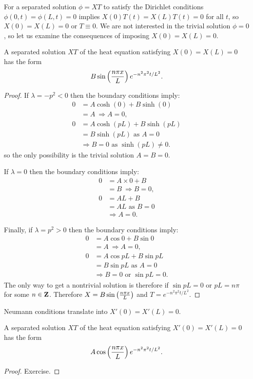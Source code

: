 For a separated solution $\phi=XT$ to satisfy the Dirichlet conditions $\phi(0,t)=\phi(L,t)=0$ implies $X(0)T(t)=X(L)T(t)=0$ for all $t$, so $X(0)=X(L)=0$ or $T\equiv 0$. We are not interested in the trivial solution $\phi=0$, so let us examine the consequences of imposing $X(0)=X(L)=0$.

\begin{lma}\label{lma:dirichlet}
A separated solution $XT$ of the heat equation satisfying $X(0)=X(L)=0$ has the form
\[B\sin\left(\frac{n \pi x}{L}\right)e^{-n^2\pi^2t/L^2}.\]
\end{lma}
\begin{proof}
If $\lambda=-p^2<0$ then the boundary conditions imply:
\begin{align*}
0&=A\cosh(0)+B\sinh(0)\\
 &=A\ \Rightarrow A=0,\\
0&=A\cosh(pL)+B\sinh(pL)\\
 &=B\sinh(pL)\mbox{ as }A=0\\
 &\Rightarrow B=0\mbox{ as }\sinh(pL)\neq 0.
\end{align*}
so the only possibility is the trivial solution $A=B=0$.

If $\lambda=0$ then the boundary conditions imply:
\begin{align*}
0&=A\times 0+B\\
 &=B\ \Rightarrow B=0,\\
0&=AL+B\\
 &=AL\mbox{ as }B=0\\
 &\Rightarrow A=0.
\end{align*}

Finally, if $\lambda=p^2>0$ then the boundary conditions imply:
\begin{align*}
0&=A\cos 0+B\sin 0\\
 &=A\ \Rightarrow A=0,\\
0&=A\cos pL+B\sin pL\\
 &=B\sin pL\mbox{ as }A=0\\
 &\Rightarrow B=0\mbox{ or }\sin pL=0.
\end{align*}
The only way to get a nontrivial solution is therefore if $\sin pL=0$ or $pL=n\pi$ for some $n\in\mathbf{Z}$. Therefore $X=B\sin\left(\frac{n \pi x}{L}\right)$ and $T=e^{-n^2\pi^2t/L^2}$.
\end{proof}

Neumann conditions translate into $X'(0)=X'(L)=0$.

\begin{lma}
A separated solution $XT$ of the heat equation satisfying $X'(0)=X'(L)=0$ has the form
\[A\cos\left(\frac{n \pi x}{L}\right)e^{-n^2\pi^2t/L^2}.\]
\end{lma}
\begin{proof}
Exercise.
\end{proof}


